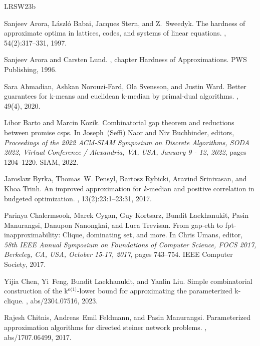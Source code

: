 \documentclass[10pt,a4paper]{article}
\begin{document}
\newcommand{\etalchar}[1]{$^{#1}$}
\begin{thebibliography}{LRSW23b}

Sanjeev Arora, L{\'{a}}szl{\'{o}} Babai, Jacques Stern, and Z.~Sweedyk.
\newblock The hardness of approximate optima in lattices, codes, and systems of
  linear equations.
, 54(2):317--331, 1997.

Sanjeev Arora and Carsten Lund.
, chapter Hardness of Approximations.
\newblock PWS Publishing, 1996.

Sara Ahmadian, Ashkan Norouzi{-}Fard, Ola Svensson, and Justin Ward.
\newblock Better guarantees for k-means and euclidean k-median by primal-dual
  algorithms.
, 49(4), 2020.

Libor Barto and Marcin Kozik.
\newblock Combinatorial gap theorem and reductions between promise csps.
\newblock In Joseph~(Seffi) Naor and Niv Buchbinder, editors, {\em Proceedings
  of the 2022 {ACM-SIAM} Symposium on Discrete Algorithms, {SODA} 2022, Virtual
  Conference / Alexandria, VA, USA, January 9 - 12, 2022}, pages 1204--1220.
  {SIAM}, 2022.

\bibitem[BPR{\etalchar{+}}17]{BPR+17}
Jaroslaw Byrka, Thomas~W. Pensyl, Bartosz Rybicki, Aravind Srinivasan, and Khoa
  Trinh.
\newblock An improved approximation for \emph{k}-median and positive
  correlation in budgeted optimization.
, 13(2):23:1--23:31, 2017.

\bibitem[CCK{\etalchar{+}}17]{CCK+17}
Parinya Chalermsook, Marek Cygan, Guy Kortsarz, Bundit Laekhanukit, Pasin
  Manurangsi, Danupon Nanongkai, and Luca Trevisan.
\newblock From gap-eth to fpt-inapproximability: Clique, dominating set, and
  more.
\newblock In Chris Umans, editor, {\em 58th {IEEE} Annual Symposium on
  Foundations of Computer Science, {FOCS} 2017, Berkeley, CA, USA, October
  15-17, 2017}, pages 743--754. {IEEE} Computer Society, 2017.

Yijia Chen, Yi~Feng, Bundit Laekhanukit, and Yanlin Liu.
\newblock Simple combinatorial construction of the k\({}^{\mbox{o(1)}}\)-lower
  bound for approximating the parameterized k-clique.
, abs/2304.07516, 2023.

Rajesh Chitnis, Andreas~Emil Feldmann, and Pasin Manurangsi.
\newblock Parameterized approximation algorithms for directed steiner network
  problems.
, abs/1707.06499, 2017.


\end{thebibliography}
\end{document}

